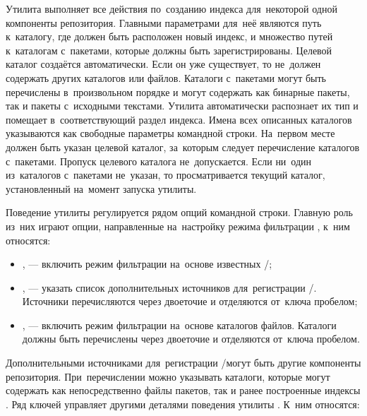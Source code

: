 Утилита  выполняет все действия по~созданию индекса для~некоторой одной компоненты репозитория.
Главными параметрами для~неё являются путь к~каталогу, где должен быть расположен новый индекс,
и множество путей к~каталогам с~пакетами, которые должны быть зарегистрированы.
Целевой каталог создаётся автоматически.
Если он уже существует, то не~должен содержать других каталогов или файлов.
Каталоги с~пакетами могут быть перечислены в~произвольном порядке и могут содержать как бинарные пакеты, так и пакеты  с~исходными текстами.
Утилита  автоматически распознает их тип и помещает в~соответствующий раздел индекса.
Имена всех описанных каталогов указываются как свободные параметры командной строки.
На~первом месте должен быть указан целевой каталог, за~которым следует перечисление каталогов с~пакетами.
Пропуск целевого каталога не~допускается. 
Если ни~один из~каталогов с~пакетами не~указан, то просматривается текущий каталог, установленный на~момент запуска утилиты.

Поведение утилиты регулируется рядом опций командной строки.
Главную роль из~них играют опции, направленные на~настройку режима фильтрации \provides, к~ним относятся:

\begin{itemize}

\item{
,  --- включить режим фильтрации \provides на~основе известных \requires/\conflicts; %
}

\item {
,  --- указать список дополнительных источников для~регистрации \requires/\conflicts. 
Источники перечисляются через двоеточие и отделяются от~ключа пробелом;
}

\item {
,  --- включить режим фильтрации \provides на~основе каталогов файлов.
Каталоги должны быть перечислены через двоеточие и отделяются от~ключа пробелом.
}

\end{itemize}

Дополнительными источниками  для~регистрации \requires/\conflicts могут быть другие компоненты репозитория.
При~перечислении можно указывать каталоги, которые могут содержать как непосредственно файлы пакетов, так и ранее построенные индексы \ds.
Ряд ключей управляет другими деталями поведения утилиты . 
К~ним относятся:


